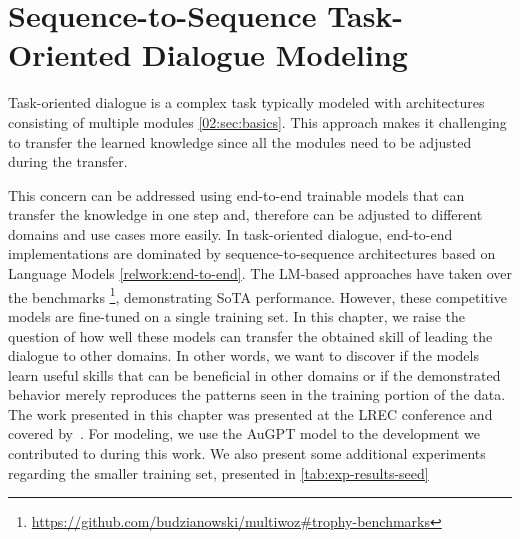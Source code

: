 \chapter{Sequence-to-Sequence Task-Oriented Dialogue Modeling}
\label{chap:lm-tod}
Task-oriented dialogue is a complex task typically modeled with architectures consisting of multiple modules \ref{02:sec:basics}.
This approach makes it challenging to transfer the learned knowledge since all the modules need to be adjusted during the transfer.

This concern can be addressed using end-to-end trainable models that can transfer the knowledge in one step and, therefore can be adjusted to different domains and use cases more easily.
In task-oriented dialogue, end-to-end implementations are dominated by sequence-to-sequence architectures based on Language Models \ref{relwork:end-to-end}.
The LM-based approaches have taken over the benchmarks \footnote{\url{https://github.com/budzianowski/multiwoz\#trophy-benchmarks}}, demonstrating SoTA performance.
However, these competitive models are fine-tuned on a single training set.
In this chapter, we raise the question of how well these models can transfer the obtained skill of leading the dialogue to other domains.
In other words, we want to discover if the models learn useful skills that can be beneficial in other domains or if the demonstrated behavior merely reproduces the patterns seen in the training portion of the data.
The work presented in this chapter was presented at the LREC conference and covered by~\citet{hudecek-etal-2022-unifying}.
For modeling, we use the AuGPT model \cite{kulhanek-etal-2021-augpt} to the development we contributed to during this work.
We also present some additional experiments regarding the smaller training set, presented in \ref{tab:exp-results-seed}

